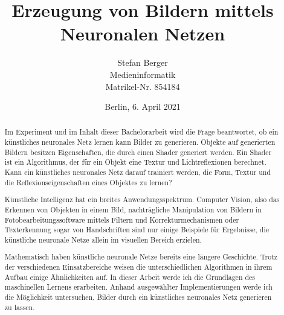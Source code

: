 \titlehead{Berliner Hochschule für Technik Berlin\\Fachbereich VI -- Informatik und Medien}
\subject{Bachelorarbeit}
\title{Erzeugung von Bildern mittels Neuronalen Netzen}
\author{Stefan Berger\\Medieninformatik\\Matrikel-Nr. 854184}
\date{Berlin, 6. April 2021}

\publishers{Betreut von: Prof.~Dr.~F.~Gers \\
\bigskip Gutachter: Prof.~Dr.~J.~Schimkat}


\maketitle

\begin{abstract}
\vspace{\baselineskip}
Im Experiment und im Inhalt dieser Bachelorarbeit wird die Frage beantwortet, ob ein künstliches neuronales Netz lernen kann Bilder zu generieren. Objekte auf generierten Bildern besitzen Eigenschaften, die durch einen Shader generiert werden. Ein Shader ist ein Algorithmus, der für ein Objekt eine Textur und Lichtreflexionen berechnet. Kann ein künstliches neuronales Netz darauf trainiert werden, die Form, Textur und die Reflexionseigenschaften eines Objektes zu lernen?

Künstliche Intelligenz hat ein breites Anwendungsspektrum. Computer Vision, also das Erkennen von Objekten in einem Bild, nachträgliche Manipulation von Bildern in Fotobearbeitungssoftware mittels Filtern und Korrekturmechanismen oder Texterkennung sogar von Handschriften sind nur einige Beispiele für Ergebnisse, die künstliche neuronale Netze allein im visuellen Bereich erzielen.

Mathematisch haben künstliche neuronale Netze bereits eine längere Geschichte. Trotz der verschiedenen Einsatzbereiche weisen die unterschiedlichen Algorithmen in ihrem Aufbau einige Ähnlichkeiten auf. In dieser Arbeit werde ich die Grundlagen des maschinellen Lernens erarbeiten. Anhand ausgewählter Implementierungen werde ich die Möglichkeit untersuchen, Bilder durch ein künstliches neuronales Netz generieren zu lassen.

\end{abstract}
